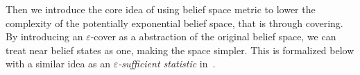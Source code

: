 \documentclass[twoside]{article}
\newtheorem{theorem}{Theorem}
\newtheorem{corollary}{Corollary}
\newcommand{\CAL}[1]{\mathcal{#1}}
\newcommand{\yplu}[1]{{\color{orange}{ [\textbf{Yiping:}} #1]}}
\begin{document}
Then we introduce the core idea of using belief space metric to lower the complexity of the potentially exponential belief space, that is through covering. By introducing an $\varepsilon$-cover as a abstraction of the original belief space, we can treat near belief states as one, making the space simpler. This is formalized below with a similar idea as an \emph{$\varepsilon$-sufficient statistic} in~\cite{franccois2019overfitting, subramanian2022approximate}.

\end{document}
